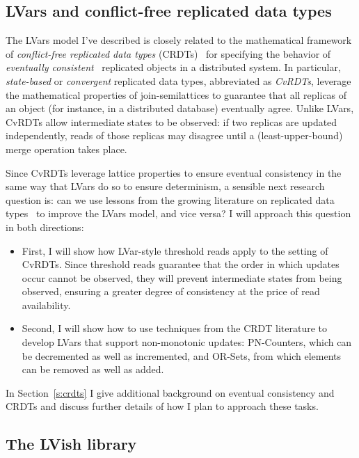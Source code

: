 \documentclass{article}
\begin{document}
\subsection{LVars and conflict-free replicated data types}

The LVars model I've described is closely related to the mathematical
framework of \emph{conflict-free replicated data types}
(CRDTs)~\cite{crdts} for specifying the behavior of \emph{eventually
  consistent}~\cite{vogels-ec} replicated objects in a distributed
system.  In particular, \emph{state-based} or \emph{convergent}
replicated data types, abbreviated as \emph{CvRDTs}, leverage the
mathematical properties of join-semilattices to guarantee that all
replicas of an object (for instance, in a distributed database)
eventually agree.  Unlike LVars, CvRDTs allow intermediate states to
be observed: if two replicas are updated independently, reads of those
replicas may disagree until a (least-upper-bound) merge operation
takes place.

Since CvRDTs leverage lattice properties to ensure eventual
consistency in the same way that LVars do so to ensure determinism, a
sensible next research question is: can we use lessons from the
growing literature on replicated data types~\cite{crdts, crdts-tr,
  rdts-popl14} to improve the LVars model, and vice versa?  I will
approach this question in both directions:
\begin{itemize}
\item First, I will show how LVar-style threshold reads apply to the
  setting of CvRDTs.  Since threshold reads guarantee that the order
  in which updates occur cannot be observed, they will prevent
  intermediate states from being observed, ensuring a greater degree
  of consistency at the price of read availability.
\item Second, I will show how to use techniques from the CRDT
  literature to develop LVars that support non-monotonic updates:
  PN-Counters, which can be decremented as well as incremented, and
  OR-Sets, from which elements can be removed as well as added.
\end{itemize}
In Section~\ref{s:crdts} I give additional background on eventual
consistency and CRDTs and discuss further details of how I plan to
approach these tasks.

\subsection{The LVish library}\label{ss:lvish}
\end{document}
